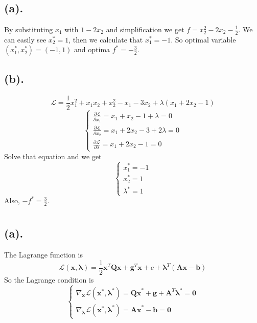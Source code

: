 \documentclass[12pt,letterpaper]{article}
\begin{document}
\section{}
\subsection*{(a).}
By substituting $x_1$ with $1-2x_2$ and simplification we get $f=x_2^2-2x_2-\frac{1}{2}$. We can easily see $x_2^*=1$, then we calculate that $x_1^*=-1$. So optimal variable $(x_1^*,x_2^*)=(-1,1)$ and optima $f^*=-\frac{3}{2}$.
\subsection*{(b).}
$$\mathcal{L}=\frac{1}{2}x_1^2+x_1x_2+x_2^2-x_1-3x_2+\lambda(x_1+2x_2-1)$$
$$\begin{cases}
\frac{\partial\mathcal{L}}{\partial x_1}=x_1+x_2-1+\lambda=0\\\frac{\partial\mathcal{L}}{\partial x_2}=x_1+2x_2-3+2\lambda=0\\\frac{\partial\mathcal{L}}{\partial\lambda}=x_1+2x_2-1=0
\end{cases}$$
Solve that equation and we get\\
$$\begin{cases}
x_1^*=-1\\
x_2^*=1\\
\lambda^*=1
\end{cases}$$
Also, $-f^*=\frac{3}{2}$.
\section{}
\subsection*{(a).}
The Lagrange function is
$$\mathcal{L}(\boldsymbol{x},\boldsymbol{\lambda})=\frac{1}{2}\boldsymbol{x}^T\boldsymbol{Qx}+\boldsymbol{g}^T\boldsymbol{x}+c+\boldsymbol{\lambda}^T(\boldsymbol{Ax}-\boldsymbol{b})$$
So the Lagrange condition is 
$$\begin{cases}
\nabla_{\boldsymbol{x}}\mathcal{L}(\boldsymbol{x^*},\boldsymbol{\lambda^*})=\boldsymbol{Qx}^*+\boldsymbol{g}+\boldsymbol{A}^T\boldsymbol{\lambda}^*=\boldsymbol{0}\\
\nabla_{\boldsymbol{\lambda}}\mathcal{L}(\boldsymbol{x^*},\boldsymbol{\lambda^*})=\boldsymbol{Ax}^*-\boldsymbol{b}=\boldsymbol{0}
\end{cases}$$
\end{document}
